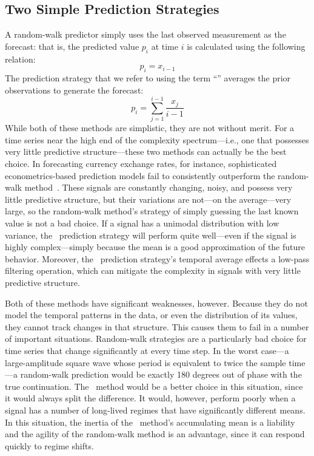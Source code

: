 \subsection{Two Simple Prediction Strategies}
\label{sec:simple}

A random-walk predictor simply uses the last observed measurement as
the forecast: that is, the predicted value $p_i$ at time $i$ is
calculated using the following relation: $$p_i = x_{i-1}$$ The
prediction strategy that we refer to using the term ``\naive''
averages the prior observations to generate the forecast: $$p_i =
\sum_{j=1}^{i-1}\frac{x_j}{i-1}$$ While both of these methods are
simplistic, they are not without merit.  For a time series near the
high end of the complexity spectrum---i.e., one that possesses very
little predictive structure---these two methods can actually be the
best choice.  In forecasting currency exchange rates, for instance,
sophisticated econometrics-based prediction models fail to
consistently outperform the random-walk method~\cite{rwMeese,rwCCE}.
These signals are constantly changing, noisy, and possess very little
predictive structure, but their variations are not---on the
average---very large, so the random-walk method's strategy of simply
guessing the last known value is not a bad choice.  If a signal has a
unimodal distribution with low variance, the \naive ~prediction
strategy will perform quite well---even if the signal is highly
complex---simply because the mean is a good approximation of the
future behavior.  Moreover, the \naive ~prediction strategy's temporal
average effects a low-pass filtering operation, which can  mitigate the
complexity in signals with very little predictive structure.

Both of these methods have significant weaknesses, however.  Because
they do not model the temporal patterns in the data, or even the
distribution of its values, they cannot track changes in that
structure.  This causes them to fail in a number of important
situations.  Random-walk strategies are a particularly bad choice for
time series that change significantly at every time step.  In the
worst case---a large-amplitude square wave whose period is equivalent
to twice the sample time---a random-walk prediction would be exactly
180 degrees out of phase with the true continuation.  The \naive
~method would be a better choice in this situation, since it would
always split the difference.  It would, however, perform poorly when a
signal has a number of long-lived regimes that have significantly
different means.  In this situation, the inertia of the \naive
~method's accumulating mean is a liability and the agility of the
random-walk method is an advantage, since it can respond quickly to
regime shifts.

